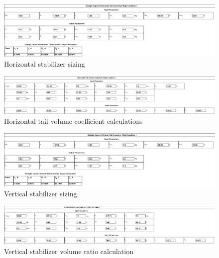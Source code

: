 \documentclass[conf]{new-aiaa}
\begin{document}
\begin{figure}[H]
    \includegraphics[width=\textwidth]{Report3Printouts/Empannage/Horizontal_geometry_cropped.png}
    \caption{Horizontal stabilizer sizing}
    \label{fig:horizontal_geometry}
\end{figure}

\begin{figure}[H]
    \includegraphics[width=\textwidth]{Report3Printouts/Empannage/Horizontal_volumeratio_cropped.png}
    \caption{Horizontal tail volume coefficient calculations}
    \label{fig:horizontal_volumeratio}
\end{figure}


\begin{figure}[H]
    \includegraphics[width=\textwidth]{Report3Printouts/Empannage/Vertical_geometry_cropped.png}
    \caption{Vertical stabilizer sizing}
    \label{fig:vertical_geometry}
\end{figure}

\begin{figure}[H]
    \includegraphics[width=\textwidth]{Report3Printouts/Empannage/Vertical_volumeratio_cropped.png}
    \caption{Vertical stabilizer volume ratio calculation}
    \label{fig:vertical_volumeratio}
\end{figure}
\end{document}
